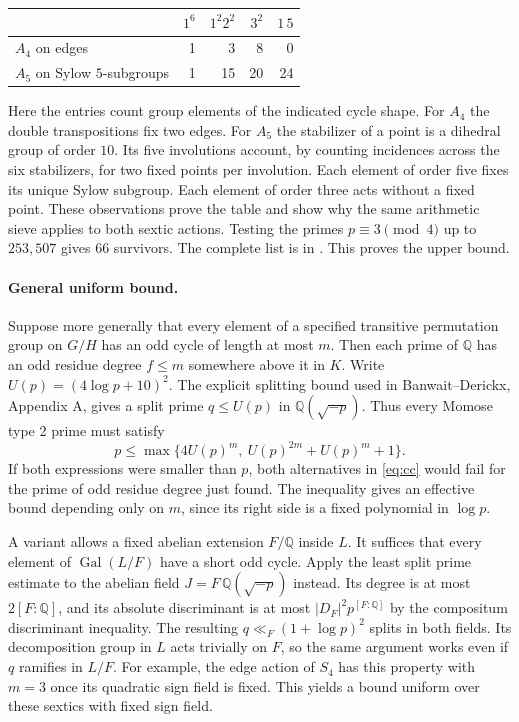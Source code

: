 \begin{center}
\begin{tabular}{lrrrr}
 & $1^6$ & $1^2 2^2$ & $3^2$ & $1\,5$\\
\hline
$A_4$ on edges & 1 & 3 & 8 & 0\\
$A_5$ on Sylow $5$-subgroups & 1 & 15 & 20 & 24
\end{tabular}
\end{center}
Here the entries count group elements of the indicated cycle shape.
For $A_4$ the double transpositions fix two edges. For $A_5$ the
stabilizer of a point is a dihedral group of order $10$. Its five
involutions account, by counting incidences across the six stabilizers,
for two fixed points per involution. Each element of order five fixes
its unique Sylow subgroup. Each element of order three acts without a
fixed point. These observations prove the table and show why the same
arithmetic sieve applies to both sextic actions. Testing the primes
$p\equiv3\pmod4$ up to $253{,}507$ gives $66$ survivors. The complete list
is in . This proves the upper bound.

\paragraph{General uniform bound.}
Suppose more generally that every element of a specified transitive
permutation group on $G/H$ has an odd cycle of length at most $m$. Then
each prime of $\mathbb Q$ has an odd residue degree $f\le m$ somewhere
above it in $K$. Write $U(p)=(4\log p+10)^2$. The explicit splitting
bound used in Banwait--Derickx, Appendix A, gives a split prime
$q\le U(p)$ in $\mathbb Q(\sqrt{-p})$. Thus every Momose type 2 prime
must satisfy
\[
 p\le \max\{4U(p)^m,\ U(p)^{2m}+U(p)^m+1\}.
\]
If both expressions were smaller than $p$, both alternatives in
\eqref{eq:cc} would fail for the prime of odd residue degree just found.
The inequality gives an effective bound depending only on $m$, since its
right side is a fixed polynomial in $\log p$.

A variant allows a fixed abelian extension $F/\mathbb Q$ inside $L$.
It suffices that every element of $\operatorname{Gal}(L/F)$ have a short
odd cycle. Apply the least split prime estimate to the abelian field
$J=F\,\mathbb Q(\sqrt{-p})$ instead. Its degree is at most
$2[F:\mathbb Q]$, and its absolute discriminant is at most
$|D_F|^2p^{[F:\mathbb Q]}$ by the compositum discriminant inequality.
The resulting $q\ll_F (1+\log p)^2$ splits in both fields. Its
decomposition group in $L$ acts trivially on $F$, so the same argument
works even if $q$ ramifies in $L/F$. For example, the edge action of
$S_4$ has this property with $m=3$ once its quadratic sign field is fixed.
This yields a bound uniform over these sextics with fixed sign field.

